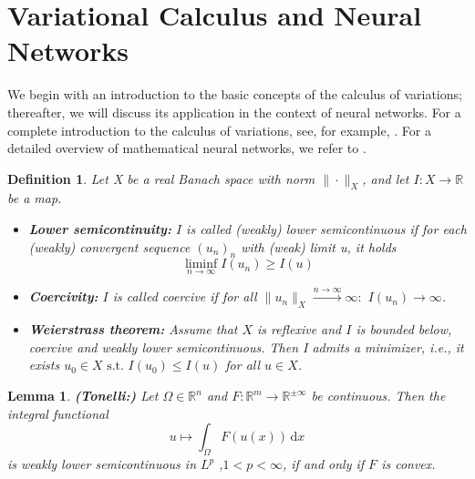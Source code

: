 \documentclass[12pt,openany]{book}
\newcommand{\R}{\mathbb{R}}
\theoremstyle{plainnormal}
\newtheorem{lemma}[theorem]{Lemma}
\newtheorem{definition}[theorem]{Definition}
\theoremstyle{remark}
\begin{document}
\section{Variational Calculus and Neural Networks}
We begin with an introduction to the basic concepts of the calculus of variations; thereafter, we will discuss its application in the context of neural networks. For a complete introduction to the calculus of variations, see, for example, \cite{Dacorogna}. For a detailed overview of mathematical neural networks, we refer to \cite{e2020mathematicalunderstandingneuralnetworkbased}.
\begin{definition}
Let X be a real Banach space with norm $\|\cdot\|_X$, and let $I: X\rightarrow\R$ be a map.
\begin{itemize}
    \item \textbf{Lower semicontinuity:} $I$ is called (weakly) \emph{lower semicontinuous} if for each (weakly) convergent sequence $(u_n)_n$ with (weak) limit u, it holds
\[\liminf_{n \to \infty} I (u_n) \geq I(u)\]
    \item \textbf{Coercivity:} $I$ is called \emph{coercive} if for all $\|u_n\|_X\xrightarrow{n\rightarrow\infty} \infty:$ $ I(u_n) \rightarrow \infty$.
    \item \textbf{Weierstrass theorem:} Assume that $X$ is reflexive and $I$ is bounded below, coercive and weakly lower semicontinuous. Then I admits a minimizer, i.e., it exists $u_0 \in X \text{ s.t. } I(u_0) \leq I(u)$ for all $ u \in X$.
    \label{Weierstrass}
\end{itemize}
    
\end{definition}
\begin{lemma}\label{thm:Tonelli}\textbf{(Tonelli:)}
    Let $\Omega \in \R^n$ and $F:\R^m\rightarrow\R^{\pm\infty}$ be continuous. Then the integral functional $$u \mapsto \int_\Omega F(u(x))\,\mathrm{d}x$$
    is weakly lower semicontinuous in $L^p$ ,$1<p<\infty$, if and only if $F$ is convex.
\end{lemma}
\end{document}
